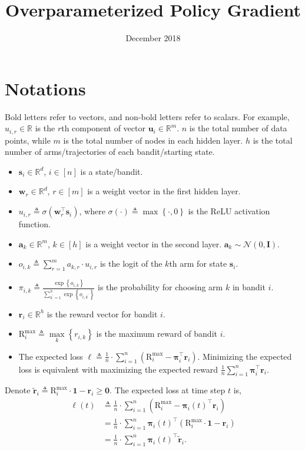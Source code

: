 \documentclass[10pt]{article}
\title{Overparameterized Policy Gradient}
\author{}
\date{December 2018}
\def\rva{{\mathbf{a}}}
\def\rvr{{\mathbf{r}}}
\def\rvs{{\mathbf{s}}}
\def\rvu{{\mathbf{u}}}
\def\rvw{{\mathbf{w}}}
\def\rvone{{\mathbf{1}}}
\def\rvzero{{\mathbf{0}}}
\def\rvtilder{{\tilde{\mathbf{r}}}}
\def\r{{\text{R}}}
\def\rvpi{{\boldsymbol{\pi}}}
\def\rmI{{\mathbf{I}}}
\def\sR{{\mathbb{R}}}
\def\gN{{\mathcal{N}}}
\begin{document}
\maketitle

\section{Notations}

Bold letters refer to vectors, and non-bold letters refer to scalars. For example, $u_{i,r} \in \sR$ is the $r$th component of vector $\rvu_i \in \sR^m$. $n$ is the total number of data points, while $m$ is the total number of nodes in each hidden layer. $h$ is the total number of arms/trajectories of each bandit/starting state.

\begin{itemize}
	\item $\rvs_i \in \sR^d$, $i \in [n]$ is a state/bandit.
	\item $\rvw_r \in \sR^d$, $r \in [m]$ is a weight vector in the first hidden layer.
	\item $u_{i,r} \triangleq \sigma(\rvw_r^\top \rvs_i)$, where $\sigma(\cdot) \triangleq \max\left\{ \cdot, 0 \right\}$ is the ReLU activation function.
	\item $\rva_k \in \sR^m$, $k \in [h]$ is a weight vector in the second layer. $\rva_k \sim \gN(0, \rmI)$.
	\item $o_{i,k} \triangleq \sum\limits_{r=1}^{m}{a_{k,r} \cdot u_{i,r}}$ is the logit of the $k$th arm for state $\rvs_i$.
	\item $\pi_{i,k} \triangleq \frac{\exp\left\{ o_{i,k} \right\}}{\sum\limits_{k^\prime = 1}^{h}{\exp\left\{ o_{i,k^\prime} \right\}}}$ is the  probability for choosing arm $k$ in bandit $i$.
	\item $\rvr_i \in \sR^h$ is the reward vector for bandit $i$.
	\item $\r_i^{\max} \triangleq \max\limits_{k}\left\{ r_{i,k} \right\}$ is the maximum reward of bandit $i$.
	\item The expected loss $\ell \triangleq \frac{1}{n} \cdot \sum\limits_{i=1}^{n}{ \left( \r_i^{\max} - \rvpi_i^\top \rvr_i \right) }$. Minimizing the expected loss is equivalent with maximizing the expected reward $\frac{1}{n} \sum\limits_{i=1}^{n}{\rvpi_i^\top \rvr_i}$.
\end{itemize}

Denote $\rvtilder_{i} \triangleq \r_i^{\max} \cdot \rvone -  \rvr_{i} \ge \rvzero$. The expected loss at time step $t$ is,
\begin{equation*}
\begin{split}
	\ell(t) &\triangleq \frac{1}{n} \cdot \sum\limits_{i=1}^{n}{ \left( \r_i^{\max} - \rvpi_{i}(t)^\top \rvr_i \right) } \\
	&= \frac{1}{n} \cdot \sum\limits_{i=1}^{n}{ \rvpi_{i}(t)^\top \left( \r_i^{\max} \cdot \rvone - \rvr_{i} \right) } \\
	&= \frac{1}{n} \cdot \sum\limits_{i=1}^{n}{ \rvpi_{i}(t)^\top \rvtilder_{i} }.
\end{split}
\end{equation*}
\end{document}
